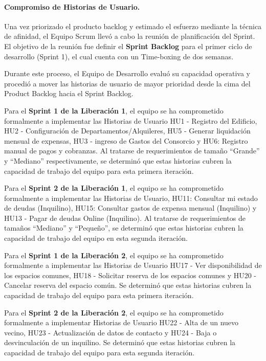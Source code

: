 \paragraph{Compromiso de Historias de Usuario.}
Una vez priorizado el producto backlog y estimado el esfuerzo mediante la técnica de afinidad, el Equipo Scrum llevó a cabo la reunión de planificación del Sprint. El objetivo de la reunión fue definir el \textbf{Sprint Backlog} para el primer ciclo de desarrollo (Sprint 1), el cual cuenta con un Time-boxing de dos semanas.

Durante este proceso, el Equipo de Desarrollo evaluó su capacidad operativa y procedió a mover las historias de usuario de mayor prioridad desde la cima del Product Backlog hacia el Sprint Backlog.

Para el \textbf{Sprint 1 de la Liberación 1}, el equipo se ha comprometido formalmente a implementar las Historias de Usuario HU1 - Registro del Edificio, HU2 - Configuración de Departamentos/Alquileres, HU5 - Generar liquidación mensual de expensas, HU3 - ingreso de Gastos del Consorcio y HU6: Registro manual de pagos y cobranzas. Al tratarse de requerimientos de tamaño ``Grande'' y ``Mediano'' respectivamente, se determinó que estas historias cubren la capacidad de trabajo del equipo para esta primera iteración.

Para el \textbf{Sprint 2 de la Liberación 1}, el equipo se ha comprometido formalmente a implementar las Historias de Usuario, HU11: Consultar mi estado de deudas (Inquilino), HU15: Consultar gastos de expensa mensual (Inquilino) y HU13 - Pagar de deudas Online (Inquilino). Al tratarse de requerimientos de tamaños ``Mediano'' y ``Pequeño'', se determinó que estas historias cubren la capacidad de trabajo del equipo en esta segunda iteración.

Para el \textbf{Sprint 1 de la Liberación 2}, el equipo se ha comprometido formalmente a implementar las Historias de Usuario HU17 - Ver disponibilidad de los espacios comunes, HU18 - Solicitar reserva de los espacios comunes y HU20 - Cancelar reserva del espacio común. Se determinó que estas historias cubren la capacidad de trabajo del equipo para esta primera iteración.

Para el \textbf{Sprint 2 de la Liberación 2}, el equipo se ha comprometido formalmente a implementar Historias de Usuario HU22 - Alta de un nuevo vecino, HU23 - Actualización de datos de contacto y HU24 - Baja o desvinculación de un inquilino. Se determinó que estas historias cubren la capacidad de trabajo del equipo para esta segunda iteración.


